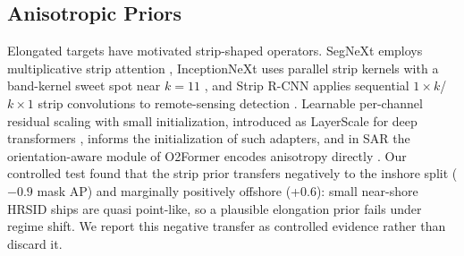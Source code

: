 \subsection{Anisotropic Priors}
\label{sec:related-aniso}
Elongated targets have motivated strip-shaped operators. SegNeXt employs multiplicative strip attention \cite{segnext2022}, InceptionNeXt uses parallel strip kernels with a band-kernel sweet spot near $k=11$ \cite{inceptionnext2024}, and Strip R-CNN applies sequential $1\times k$/$k\times 1$ strip convolutions to remote-sensing detection \cite{striprcnn2026}. Learnable per-channel residual scaling with small initialization, introduced as LayerScale for deep transformers \cite{cait2021}, informs the initialization of such adapters, and in SAR the orientation-aware module of O2Former encodes anisotropy directly \cite{o2former2025}. Our controlled test found that the strip prior transfers negatively to the inshore split ($-0.9$ mask AP) and marginally positively offshore (+0.6): small near-shore HRSID ships are quasi point-like, so a plausible elongation prior fails under regime shift. We report this negative transfer as controlled evidence rather than discard it.
